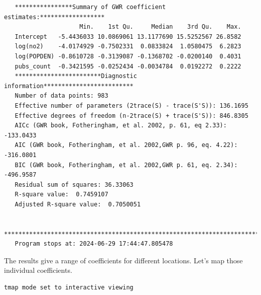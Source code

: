 \documentclass[
  letterpaper,
]{scrbook}
\newenvironment{Shaded}{\begin{snugshade}}{\end{snugshade}}
\newcommand{\CommentTok}[1]{\textcolor[rgb]{0.37,0.37,0.37}{#1}}
\newcommand{\FunctionTok}[1]{\textcolor[rgb]{0.28,0.35,0.67}{#1}}
\newcommand{\NormalTok}[1]{\textcolor[rgb]{0.00,0.23,0.31}{#1}}
\newcommand{\OtherTok}[1]{\textcolor[rgb]{0.00,0.23,0.31}{#1}}
\newcommand{\SpecialCharTok}[1]{\textcolor[rgb]{0.37,0.37,0.37}{#1}}
\newcommand{\StringTok}[1]{\textcolor[rgb]{0.13,0.47,0.30}{#1}}
\begin{document}
\begin{verbatim}
   ****************Summary of GWR coefficient estimates:******************
                     Min.    1st Qu.     Median    3rd Qu.    Max.
   Intercept   -5.4436033 10.0869061 13.1177690 15.5252567 26.8582
   log(no2)    -4.0174929 -0.7502331  0.0833824  1.0580475  6.2823
   log(POPDEN) -0.8610728 -0.3139087 -0.1368702 -0.0200140  0.4031
   pubs_count  -0.3421595 -0.0252434 -0.0034784  0.0192272  0.2222
   ************************Diagnostic information*************************
   Number of data points: 983 
   Effective number of parameters (2trace(S) - trace(S'S)): 136.1695 
   Effective degrees of freedom (n-2trace(S) + trace(S'S)): 846.8305 
   AICc (GWR book, Fotheringham, et al. 2002, p. 61, eq 2.33): -133.0433 
   AIC (GWR book, Fotheringham, et al. 2002,GWR p. 96, eq. 4.22): -316.0801 
   BIC (GWR book, Fotheringham, et al. 2002,GWR p. 61, eq. 2.34): -496.9587 
   Residual sum of squares: 36.33063 
   R-square value:  0.7459107 
   Adjusted R-square value:  0.7050051 

   ***********************************************************************
   Program stops at: 2024-06-29 17:44:47.805478 
\end{verbatim}

The results give a range of coefficients for different locations. Let's
map those individual coefficients.

\begin{Shaded}
\end{Shaded}

\begin{verbatim}
tmap mode set to interactive viewing
\end{verbatim}
\end{document}
